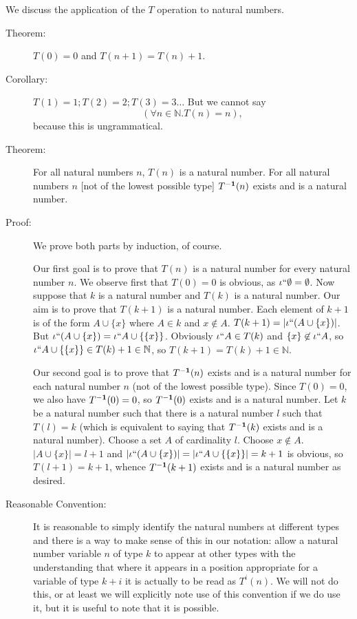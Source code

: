 \documentclass[12pt]{book}
\begin{document}
We discuss the application of the $T$ operation to natural numbers.

\begin{description}

\item[Theorem:]  $T(0)=0$ and $T(n+1) = T(n)+1$.

\item[Corollary:]  $T(1)=1; T(2)=2; T(3)=3\ldots$  But we cannot say
$$(\forall n \in {\mathbb N}.T(n)=n),$$ because this is ungrammatical.

\item[Theorem:] For all natural numbers $n$, $T(n)$ is a natural
number.  For all natural numbers $n$ [not of the lowest possible type]
$T^{\bf -1}(n)$ exists and is a natural number.

\item[Proof:]  We prove both parts by induction, of course.

Our first goal is to prove that $T(n)$ is a natural number for every
natural number $n$.  We observe first that $T(0)=0$ is obvious, as
$\iota``\emptyset = \emptyset$.  Now suppose that $k$ is a natural
number and $T(k)$ is a natural number.  Our aim is to prove that
$T(k+1)$ is a natural number.  Each element of $k+1$ is of the form $A
\cup \{x\}$ where $A \in k$ and $x \not\in A$.  $T(k+1) = |\iota``(A
\cup \{x\})|$.  But $\iota``(A \cup \{x\}) = \iota``A \cup \{\{x\}\}$.
Obviously $\iota``A \in T(k)$ and $\{x\} \not\in \iota``A$, so
$\iota``A \cup \{\{x\}\} \in T(k)+1\in {\mathbb N}$, so $T(k+1) =
T(k)+1 \in {\mathbb N}$.

Our second goal is to prove that $T^{\bf -1}(n)$ exists and is a natural
number for each natural number $n$ (not of the lowest possible type).
Since $T(0)=0$, we also have $T^{\bf -1}(0)=0$, so $T^{\bf -1}(0)$ exists and
is a natural number.  Let $k$ be a natural number such that there is a
natural number $l$ such that $T(l)=k$ (which is equivalent to saying
that $T^{\bf -1}(k)$ exists and is a natural number).  Choose a set $A$ of
cardinality $l$.  Choose $x \not\in A$.  $|A \cup \{x\}| = l+1$ and
$|\iota``(A \cup \{x\})| = |\iota``A \cup \{\{x\}\}| = k+1$ is
obvious, so $T(l+1) = k+1$, whence $T^{\bf -1}(k+1)$ exists and is a
natural number as desired.

\item[Reasonable Convention:] It is reasonable to simply identify the
natural numbers at different types and there is a way to make sense of
this in our notation: allow a natural number variable $n$ of type $k$
to appear at other types with the understanding that where it appears
in a position appropriate for a variable of type $k+i$ it is actually
to be read as $T^i(n)$.  We will not do this, or at least we will
explicitly note use of this convention if we do use it, but it is
useful to note that it is possible.


\end{description}
\end{document}
